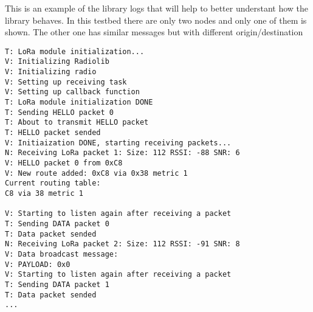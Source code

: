 This is an example of the library logs that will help to better understant how the library behaves. In this testbed there are only two nodes and only one of them is shown. The other one has similar messages but with different origin/destination

\begin{lstlisting}[numbers=none, caption={Fragment of the initialization logs of the library where it can be seen how the library recieves telemetry from other nodes, builds the routing table and sends some data.}, label=lst:LibraryLog,captionpos=b]
T: LoRa module initialization...
V: Initializing Radiolib
V: Initializing radio
V: Setting up receiving task
V: Setting up callback function
T: LoRa module initialization DONE
T: Sending HELLO packet 0
T: About to transmit HELLO packet
T: HELLO packet sended
V: Initiaization DONE, starting receiving packets...
N: Receiving LoRa packet 1: Size: 112 RSSI: -88 SNR: 6
V: HELLO packet 0 from 0xC8
V: New route added: 0xC8 via 0x38 metric 1
Current routing table:
C8 via 38 metric 1

V: Starting to listen again after receiving a packet
T: Sending DATA packet 0
T: Data packet sended
N: Receiving LoRa packet 2: Size: 112 RSSI: -91 SNR: 8
V: Data broadcast message:
V: PAYLOAD: 0x0
V: Starting to listen again after receiving a packet
T: Sending DATA packet 1
T: Data packet sended
...
\end{lstlisting}



